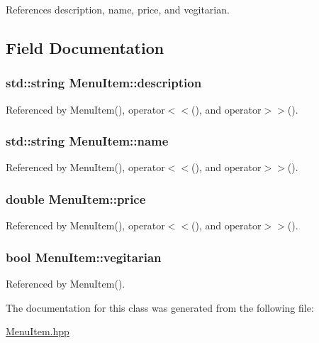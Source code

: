 References description, name, price, and vegitarian.



\subsection{Field Documentation}
\hypertarget{classMenuItem_adb476bca2e942c3056ad279c0b1c0866}{
\subsubsection[{description}]{\setlength{\rightskip}{0pt plus 5cm}std\-::string Menu\-Item\-::description}}\label{classMenuItem_adb476bca2e942c3056ad279c0b1c0866}


Referenced by Menu\-Item(), operator$<$$<$(), and operator$>$$>$().

\hypertarget{classMenuItem_a0e46de23f339da33aebb4b14ada546a7}{
\subsubsection[{name}]{\setlength{\rightskip}{0pt plus 5cm}std\-::string Menu\-Item\-::name}}\label{classMenuItem_a0e46de23f339da33aebb4b14ada546a7}


Referenced by Menu\-Item(), operator$<$$<$(), and operator$>$$>$().

\hypertarget{classMenuItem_a05ed0defbede1c8398b3f3a610c1c732}{
\subsubsection[{price}]{\setlength{\rightskip}{0pt plus 5cm}double Menu\-Item\-::price}}\label{classMenuItem_a05ed0defbede1c8398b3f3a610c1c732}


Referenced by Menu\-Item(), operator$<$$<$(), and operator$>$$>$().

\hypertarget{classMenuItem_afe18f07bb75ef12db765b92a245d9ac3}{
\subsubsection[{vegitarian}]{\setlength{\rightskip}{0pt plus 5cm}bool Menu\-Item\-::vegitarian}}\label{classMenuItem_afe18f07bb75ef12db765b92a245d9ac3}


Referenced by Menu\-Item().



The documentation for this class was generated from the following file\-:\begin{DoxyCompactItemize}
\item 
\hyperlink{MenuItem_8hpp}{Menu\-Item.\-hpp}\end{DoxyCompactItemize}
